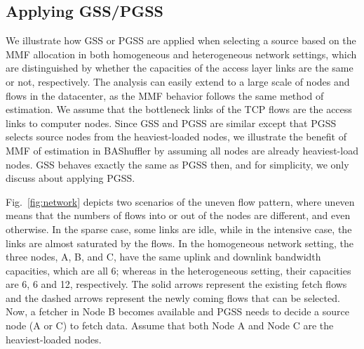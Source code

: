 \documentclass[10pt,journal,compsoc]{IEEEtran}
\begin{document}
\subsection{Applying GSS/PGSS}\label{section:analysis}
We illustrate how GSS or PGSS are applied when selecting a source based on the
MMF allocation in both homogeneous and heterogeneous
network settings, which are distinguished by whether the capacities
of the access layer links are the same or not, respectively.
The analysis can easily extend to a large scale of nodes and flows in
the datacenter, as the MMF behavior follows the same
method of estimation.
We assume that the bottleneck links of the TCP
flows are the access links to computer nodes.
Since GSS and PGSS are similar except that PGSS selects source nodes from the heaviest-loaded nodes,
we illustrate the benefit of MMF of estimation in BAShuffler by assuming all nodes are already heaviest-load nodes. 
GSS behaves exactly the same as PGSS then, and for simplicity, we only discuss about applying PGSS.



Fig.~\ref{fig:network} depicts 
two scenarios of the uneven flow pattern, where uneven means
that the numbers of flows into or out of the nodes are different, and even otherwise. 
In the sparse case, some links are idle, while in the intensive case, the
links are almost saturated by the flows.
In the homogeneous network setting,
the three nodes, A, B, and C, have the same uplink and downlink bandwidth
capacities, %
which are all 6; whereas in the heterogeneous setting,
their capacities are 6, 6 and 12, respectively.
The solid arrows represent the existing fetch flows and the dashed arrows represent the newly coming flows that can be selected. 
Now, a fetcher in Node B becomes available and PGSS needs to decide a source
node (A or C) to fetch data. 
Assume that both Node A and Node C are the heaviest-loaded nodes.
\end{document}
